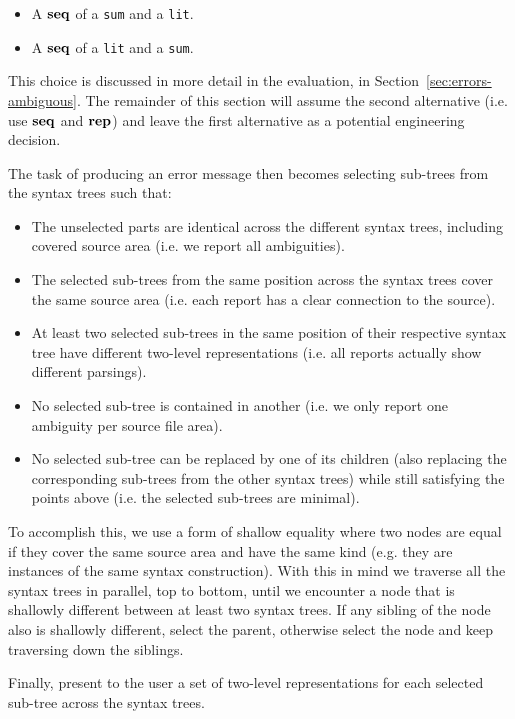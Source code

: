 \documentclass{kththesis}
\begin{document}
\begin{itemize}
  \item A $\mathrel{\mathbf{seq}}$ of a \texttt{sum} and a \texttt{lit}.
  \item A $\mathrel{\mathbf{seq}}$ of a \texttt{lit} and a \texttt{sum}.
\end{itemize}

This choice is discussed in more detail in the evaluation, in Section~\ref{sec:errors-ambiguous}. The remainder of this section will assume the second alternative (i.e. use $\mathrel{\mathbf{seq}}$ and $\mathrel{\mathbf{rep}}$) and leave the first alternative as a potential engineering decision.

The task of producing an error message then becomes selecting sub-trees from the syntax trees such that:

\begin{itemize}
  \item The unselected parts are identical across the different syntax trees, including covered source area (i.e. we report all ambiguities).
  \item The selected sub-trees from the same position across the syntax trees cover the same source area (i.e. each report has a clear connection to the source).
  \item At least two selected sub-trees in the same position of their respective syntax tree have different two-level representations (i.e. all reports actually show different parsings).
  \item No selected sub-tree is contained in another (i.e. we only report one ambiguity per source file area).
  \item No selected sub-tree can be replaced by one of its children (also replacing the corresponding sub-trees from the other syntax trees) while still satisfying the points above (i.e. the selected sub-trees are minimal).
\end{itemize}

To accomplish this, we use a form of shallow equality where two nodes are equal if they cover the same source area and have the same kind (e.g. they are instances of the same syntax construction). With this in mind we traverse all the syntax trees in parallel, top to bottom, until we encounter a node that is shallowly different between at least two syntax trees. If any sibling of the node also is shallowly different, select the parent, otherwise select the node and keep traversing down the siblings.

Finally, present to the user a set of two-level representations for each selected sub-tree across the syntax trees.
\end{document}

